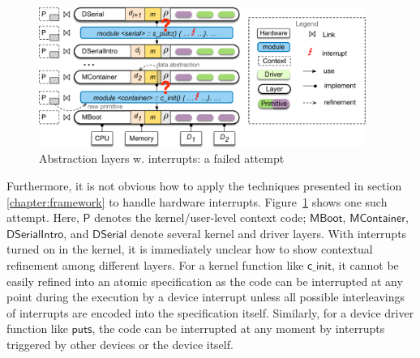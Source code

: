 \begin{figure}[t]
	\begin{center}
		\includegraphics[width=0.95\textwidth]{figs/layer_pre}
	\end{center}
	\caption{Abstraction layers w. interrupts: a failed attempt}
	\label{fig:layer_pre}
\end{figure}

Furthermore, it is not obvious how to apply the techniques presented
in section \ref{chapter:framework}
to handle hardware interrupts. Figure~\ref{fig:layer_pre} shows one
such attempt.  Here, $\textsf{P}$ denotes the kernel/user-level
context code; $\textsf{MBoot}$, $\textsf{MContainer}$,
$\textsf{DSerialIntro}$, and $\textsf{DSerial}$ denote several kernel
and driver layers.  With interrupts turned on in the kernel, it is
immediately unclear how to show contextual refinement among different
layers. For a kernel function like $\textsf{c\_init}$, it cannot be
easily refined into an atomic specification as the code can be
interrupted at any point during the execution by a device interrupt
unless all possible interleavings of interrupts are encoded into the
specification itself. Similarly, for a device driver function like
$\textsf{puts}$, the code can be interrupted at any moment by
interrupts triggered by other devices or the device itself.



